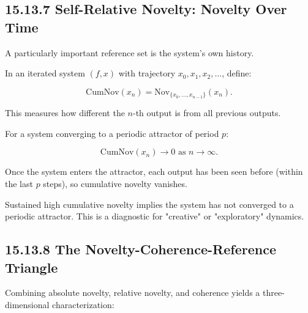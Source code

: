 \subsection{15.13.7 Self-Relative Novelty: Novelty Over Time}

A particularly important reference set is the system's own history.

\begin{definition}
In an iterated system $(f, x)$ with trajectory $x_0, x_1, x_2, \ldots$, define:

\[\mathrm{CumNov}(x_n) = \mathrm{Nov}_{\{x_0, \ldots, x_{n-1}\}}(x_n).\]

This measures how different the $n$-th output is from all previous outputs.
\end{definition}

\begin{proposition}
For a system converging to a periodic attractor of period $p$:

\[\mathrm{CumNov}(x_n) \to 0 \text{ as } n \to \infty.\]

Once the system enters the attractor, each output has been seen before (within the last $p$ steps), so cumulative novelty vanishes.

\end{proposition}

\begin{corollary}
Sustained high cumulative novelty implies the system has not converged to a periodic attractor. This is a diagnostic for "creative" or "exploratory" dynamics.
\end{corollary}

\subsection{15.13.8 The Novelty-Coherence-Reference Triangle}

Combining absolute novelty, relative novelty, and coherence yields a three-dimensional characterization:

